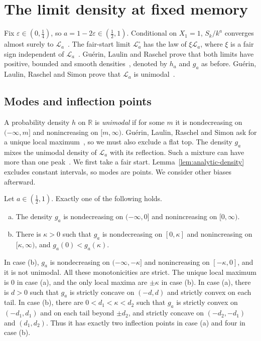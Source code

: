 \section{The limit density at fixed memory}\label{sec:bulk-applications}

Fix $\varepsilon\in(0,\frac14)$, so $a=1-2\varepsilon\in(\frac12,1)$.
Conditional on $X_1=1$, $S_k/k^a$ converges almost surely to
$\mathcal L_a$~\cite[Theorem~3.7]{bercu2018}. The fair-start limit
$\mathcal L^\circ_a$ has the law of $\xi\mathcal L_a$, where $\xi$ is a fair sign independent of
$\mathcal L_a$~\cite[(1.3) and (1.6)]{glr2026}. Gu\'erin, Laulin and Raschel
prove that both limits have positive, bounded and smooth
densities~\cite[Theorem~1.3]{glr2026}, denoted by $h_a$ and $g_a$ as before.
Gu\'erin, Laulin, Raschel and Simon prove
that $\mathcal L_a$ is unimodal~\cite[Theorem~1.1]{glrs2025}.

\subsection{Modes and inflection points}\label{sec:modes}

A probability density $h$ on $\mathbb R$ is \emph{unimodal} if for some $m$
it is nondecreasing on $(-\infty,m]$ and nonincreasing on $[m,\infty)$.
Gu\'erin, Laulin, Raschel and Simon ask for a unique local maximum~\cite{glrs2025},
so we must also exclude a flat top. The density $g_a$ mixes the
unimodal density of $\mathcal L_a$ with its reflection. Such a
mixture can have more than one peak~\cite{dj1988}. We first take a fair start.
Lemma~\ref{lem:analytic-density} excludes constant intervals,
so modes are points. We consider other biases afterward.

\begin{theorem}\label{thm:two-modes}
Let $a\in(\frac12,1)$. Exactly one of the following holds.
\begin{enumerate}[(a)]
\item The density $g_a$ is nondecreasing on $(-\infty,0]$ and nonincreasing on
$[0,\infty)$.
\item There is $\kappa>0$ such that $g_a$ is nondecreasing on $[0,\kappa]$ and
nonincreasing on $[\kappa,\infty)$, and $g_a(0)<g_a(\kappa)$.
\end{enumerate}
In case (b), $g_a$ is nondecreasing on $(-\infty,-\kappa]$ and nonincreasing on
$[-\kappa,0]$, and it is not unimodal. All these monotonicities are strict.
The unique local maximum is $0$ in case (a), and the only local maxima
are $\pm \kappa$ in case (b).
In case (a), there is $d>0$ such that $g_a$ is strictly concave on
$(-d,d)$ and strictly convex on each tail. In case (b), there are
$0<d_1<\kappa<d_2$ such that $g_a$ is strictly convex on $(-d_1,d_1)$ and
on each tail beyond $\pm d_2$, and strictly concave on
$(-d_2,-d_1)$ and $(d_1,d_2)$. Thus it has exactly two inflection points
in case (a) and four in case (b).
\end{theorem}

